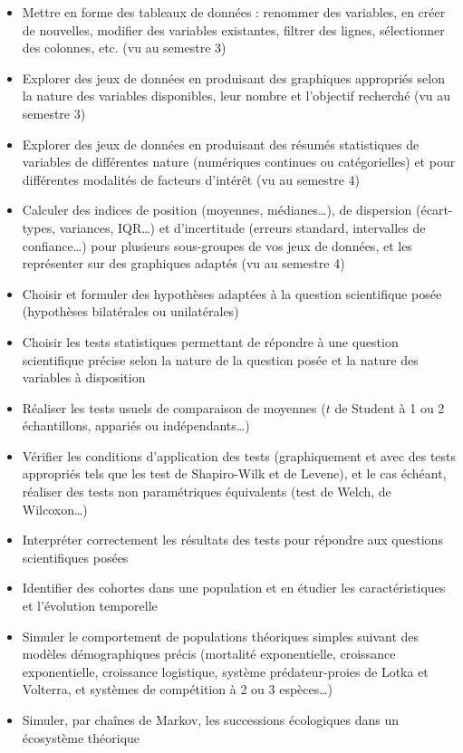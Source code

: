 \documentclass[
  french,
  a4paper,
  DIV=11,
  numbers=noendperiod,
  oneside]{scrreprt}
\providecommand{\tightlist}{%
  \setlength{\itemsep}{0pt}\setlength{\parskip}{0pt}}
\begin{document}
\begin{itemize}
\tightlist
\item
  Mettre en forme des tableaux de données : renommer des variables, en
  créer de nouvelles, modifier des variables existantes, filtrer des
  lignes, sélectionner des colonnes, etc. (vu au semestre 3)
\item
  Explorer des jeux de données en produisant des graphiques appropriés
  selon la nature des variables disponibles, leur nombre et l'objectif
  recherché (vu au semestre 3)
\item
  Explorer des jeux de données en produisant des résumés statistiques de
  variables de différentes nature (numériques continues ou
  catégorielles) et pour différentes modalités de facteurs d'intérêt (vu
  au semestre 4)
\item
  Calculer des indices de position (moyennes, médianes\ldots), de
  dispersion (écart-types, variances, IQR\ldots) et d'incertitude
  (erreurs standard, intervalles de confiance\ldots) pour plusieurs
  sous-groupes de vos jeux de données, et les représenter sur des
  graphiques adaptés (vu au semestre 4)
\item
  Choisir et formuler des hypothèses adaptées à la question scientifique
  posée (hypothèses bilatérales ou unilatérales)
\item
  Choisir les tests statistiques permettant de répondre à une question
  scientifique précise selon la nature de la question posée et la nature
  des variables à disposition
\item
  Réaliser les tests usuels de comparaison de moyennes (\(t\) de Student
  à 1 ou 2 échantillons, appariés ou indépendants\ldots)
\item
  Vérifier les conditions d'application des tests (graphiquement et avec
  des tests appropriés tels que les test de Shapiro-Wilk et de Levene),
  et le cas échéant, réaliser des tests non paramétriques équivalents
  (test de Welch, de Wilcoxon\ldots)
\item
  Interpréter correctement les résultats des tests pour répondre aux
  questions scientifiques posées
\item
  Identifier des cohortes dans une population et en étudier les
  caractéristiques et l'évolution temporelle
\item
  Simuler le comportement de populations théoriques simples suivant des
  modèles démographiques précis (mortalité exponentielle, croissance
  exponentielle, croissance logistique, système prédateur-proies de
  Lotka et Volterra, et systèmes de compétition à 2 ou 3 espèces\ldots)
\item
  Simuler, par chaînes de Markov, les successions écologiques dans un
  écosystème théorique
\end{itemize}
\end{document}
